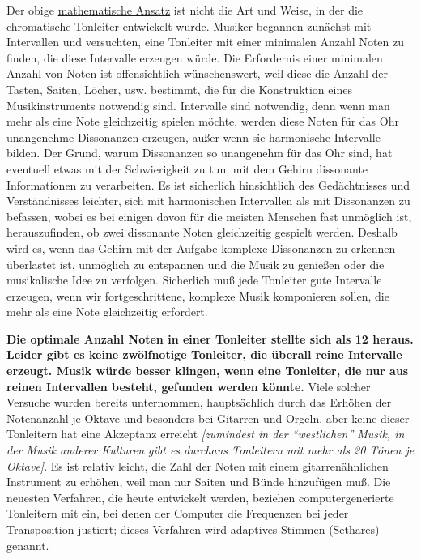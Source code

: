 Der obige \hyperlink{c2_2b}{mathematische Ansatz} ist nicht die Art und Weise, in der die chromatische Tonleiter entwickelt wurde.
 Musiker begannen zunächst mit Intervallen und versuchten, eine Tonleiter mit einer minimalen Anzahl Noten zu finden, die diese Intervalle erzeugen würde.
 Die Erfordernis einer minimalen Anzahl von Noten ist offensichtlich wünschenswert, weil diese die Anzahl der Tasten, Saiten, Löcher, usw. bestimmt, die für die Konstruktion eines Musikinstruments notwendig sind.
 Intervalle sind notwendig, denn wenn man mehr als eine Note gleichzeitig spielen möchte, werden diese Noten für das Ohr unangenehme Dissonanzen erzeugen, außer wenn sie harmonische Intervalle bilden.
 Der Grund, warum Dissonanzen so unangenehm für das Ohr sind, hat eventuell etwas mit der Schwierigkeit zu tun, mit dem Gehirn dissonante Informationen zu verarbeiten.
 Es ist sicherlich hinsichtlich des Gedächtnisses und Verständnisses leichter, sich mit harmonischen Intervallen als mit Dissonanzen zu befassen, wobei es bei einigen davon für die meisten Menschen fast unmöglich ist, herauszufinden, ob zwei dissonante Noten gleichzeitig gespielt werden.
 Deshalb wird es, wenn das Gehirn mit der Aufgabe komplexe Dissonanzen zu erkennen überlastet ist, unmöglich zu entspannen und die Musik zu genießen oder die musikalische Idee zu verfolgen.
 Sicherlich muß jede Tonleiter gute Intervalle erzeugen, wenn wir fortgeschrittene, komplexe Musik komponieren sollen, die mehr als eine Note gleichzeitig erfordert.
 

\textbf{Die optimale Anzahl Noten in einer Tonleiter stellte sich als 12 heraus.
 Leider gibt es keine zwölfnotige Tonleiter, die überall reine Intervalle erzeugt.
 Musik würde besser klingen, wenn eine Tonleiter, die nur aus reinen Intervallen besteht, gefunden werden könnte.}
 Viele solcher Versuche wurden bereits unternommen, hauptsächlich durch das Erhöhen der Notenanzahl je Oktave und besonders bei Gitarren und Orgeln, aber keine dieser Tonleitern hat eine Akzeptanz erreicht
 \textit{[zumindest in der \enquote{westlichen} Musik, in der Musik anderer Kulturen gibt es durchaus Tonleitern mit mehr als 20 Tönen je Oktave]}.
 Es ist relativ leicht, die Zahl der Noten mit einem gitarrenähnlichen Instrument zu erhöhen, weil man nur Saiten und Bünde hinzufügen muß.
 Die neuesten Verfahren, die heute entwickelt werden, beziehen computergenerierte Tonleitern mit ein, bei denen der Computer die Frequenzen bei jeder Transposition justiert; dieses Verfahren wird adaptives Stimmen (Sethares) genannt.
 

